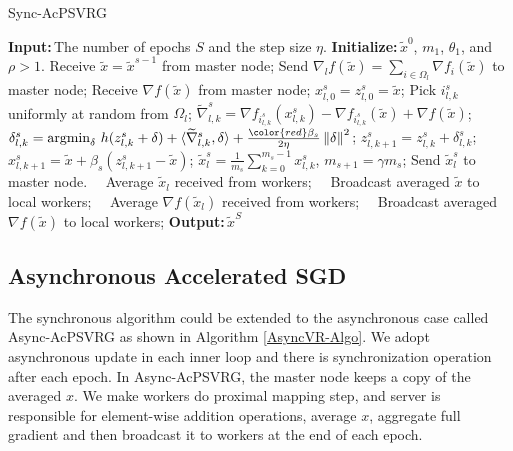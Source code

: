 \documentclass[10pt, conference, compsocconf]{IEEEtran}
\newcommand{\norm}[1]{\left\lVert#1\right\rVert}
\newcommand{\Initialize}{\textbf{Initialize:}{\,}}
\newcommand{\Input}{\textbf{Input:}{\,}}
\newcommand{\Output}{\textbf{Output:}{\,}}
\theoremstyle{definition}
\theoremstyle{remark}
\begin{document}
\begin{algorithm}[H]
\caption{Sync-AcPSVRG}\label{SyncVR-Algo-Single}
\begin{algorithmic}
\State\Input The number of epochs $S$ and the step size $\eta$.
\State\Initialize $\widetilde{x}^0$, $m_1$, $\theta_1$, and $\rho > 1$.
\State Receive $\widetilde{x} = \widetilde{x}^{s-1}$ from master node;
\State  Send $\nabla_l f(\widetilde{x}) = \sum_{i\in\Omega_l}\nabla f_i(\widetilde{x})$ to master node;
\State  Receive $\nabla f(\widetilde{x})$ from master node;
 \State $x_{l,0}^s = z_{l,0}^s = \widetilde{x}$;
 \State Pick $i_{l,k}^s$ uniformly at random from $\Omega_l$;
 \State $\widetilde{\nabla}_{l,k}^s = \nabla f_{i_{l,k}^s}(x_{l,k}^s) - \nabla f_{i_{l,k}^s}(\widetilde{x}) + \nabla f(\widetilde{x})$;
 \State $\delta_{l,k}^s = \text{argmin}_{\delta}\,\,h(z_{l,k}^s+\delta)+\langle\widetilde{\nabla}_{l,k}^s,\delta\rangle + \frac{{\color{red}\beta_s}}{2\eta}\norm{\delta}^2$;
 \State $z_{l,k+1}^s = z_{l,k}^s + \delta_{l,k}^s$;
 \State $x_{l,k+1}^s = \widetilde{x}+\beta_s(z_{l,k+1}^s-\widetilde{x})$;
 \EndFor
$\widetilde{x}_{l}^s = \frac{1}{m_s}\sum_{k=0}^{m_s-1} x_{l,k}^s$, $m_{s+1} = \gamma m_s$;
\State Send $\widetilde{x}_{l}^s$ to master node.
 \EndFor
 \EndFor
 \State\qquad\,\,\,\, Average $\widetilde{x}_l$ received from workers;
  \State\qquad\,\,\,\, Broadcast averaged $\widetilde{x}$ to local workers;
  \State\qquad\,\,\,\, Average $\nabla f(\widetilde{x}_l)$ received from workers;
  \State\qquad\,\,\,\, Broadcast averaged $\nabla f(\widetilde{x})$ to local workers;
 \State\Output $\widetilde{x}^S$
\end{algorithmic}
\end{algorithm}

\subsection{Asynchronous Accelerated SGD}

The  synchronous algorithm could be extended to the asynchronous case called Async-AcPSVRG  as shown in Algorithm \ref{AsyncVR-Algo}. We adopt asynchronous update in each inner loop and there is synchronization operation after each epoch. In Async-AcPSVRG, the  master node keeps a copy of the averaged $x$. We make workers do proximal mapping step, and server is responsible for element-wise addition operations, average $x$, aggregate full gradient and then broadcast it to workers at the end of each epoch. 
\end{document}
